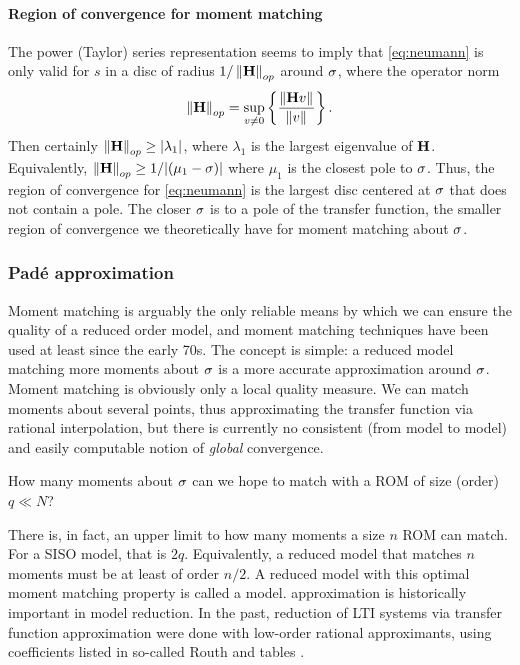 \paragraph{Region of convergence for moment matching} The power (Taylor) series representation seems to imply that \eqref{eq:neumann} is only valid for $s$ in a disc of radius $1/\left\| \textbf{\textup{H}} \right\|_{op}$ around $\sigma$, where the operator norm
\[
 \left\| \textbf{\textup{H}} \right\|_{op} =  \sup_{v\neq 0}\left\{  \dfrac{\left\| \textbf{\textup{H}} v \right\|_{}}{ \left\| v \right\|_{} } \right\}.
\]
 Then certainly $\left\| \textbf{\textup{H}} \right\|_{op} \geq | \lambda_1 |$, where $\lambda_1$ is the largest eigenvalue of $\textbf{\textup{H}}$. 
Equivalently,   $\left\| \textbf{\textup{H}} \right\|_{op} \geq 1/| (\mu_1-\sigma) |$ where $\mu_1$ is the closest pole to $\sigma$.   Thus, the 
region of convergence for \eqref{eq:neumann} is the largest disc centered at $\sigma$ that does not contain a pole.   The closer $\sigma$ is to a pole of the transfer function, the smaller region of convergence we theoretically have for moment matching about $\sigma$.
     




\subsubsection{Pad\'e approximation}
\label{sec:pade}
Moment matching is arguably the only reliable means by which we can ensure the quality of a reduced order model, and moment matching techniques have been used at least since the early 70s.  The concept is simple: a reduced model matching more moments about $\sigma$ is a more accurate approximation around $\sigma$.  Moment matching is obviously only a local quality measure.  We can match moments about several points, thus approximating the transfer function via rational interpolation,  but there is currently no consistent (from model to model) and easily computable  notion of \emph{global} convergence.  

\medskip
How many moments about $\sigma$ can we hope to match with a ROM of size (order) $q\ll N$?
\medskip
   
There is, in fact, an upper limit to how many moments a size $n$ ROM can match.   For a SISO model, that is $2q$.   Equivalently, a reduced model that matches $n$ moments must be at least of order $n/2$.  A reduced model with this optimal moment matching property is called a \pade{} model.    \pade{} approximation is historically important in model reduction.  In the past, reduction of LTI systems via transfer function approximation were done with low-order rational approximants, using coefficients listed in so-called Routh and \pade{} tables \cite{shamash1974padetype, shamash1975model}.   

